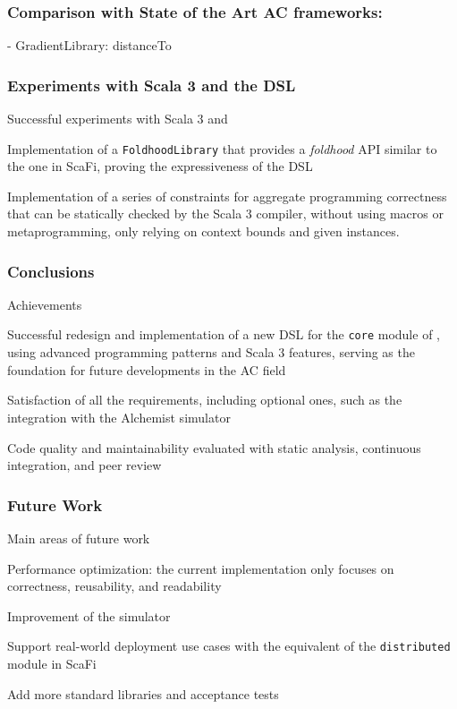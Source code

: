 \begin{frame}
    \frametitle{Comparison with State of the Art \ac{AC} frameworks: \this}
    \begin{exampleblock}{\this - GradientLibrary: distanceTo}
        
    \end{exampleblock}
\end{frame}

\begin{frame}
    \frametitle{Experiments with Scala 3 and the \ac{DSL}}
    \begin{blockitems}{Successful experiments with Scala 3 and \this}
        \item Implementation of a \texttt{FoldhoodLibrary} that provides a \textit{foldhood} \ac{API} similar to the one in ScaFi, proving the expressiveness of the \this \ac{DSL}
        \item Implementation of a series of constraints for aggregate programming correctness that can be statically checked by the Scala 3 compiler, without using macros or metaprogramming, only relying on context bounds and given instances.
    \end{blockitems}
\end{frame}

\begin{frame}
    \frametitle{Conclusions}
    \begin{blockitems}{Achievements}
        \item Successful redesign and implementation of a new \ac{DSL} for the \texttt{core} module of \this, using advanced programming patterns and Scala 3 features, serving as the foundation for future developments in the \ac{AC} field
        \item Satisfaction of all the requirements, including optional ones, such as the integration with the Alchemist simulator
        \item Code quality and maintainability evaluated with static analysis, continuous integration, and peer review
    \end{blockitems}
\end{frame}

\begin{frame}
    \frametitle{Future Work}
    \begin {blockitems}{Main areas of future work}
        \item Performance optimization: the current implementation only focuses on correctness, reusability, and readability
        \item Improvement of the simulator
        \item Support real-world deployment use cases with the equivalent of the \texttt{distributed} module in ScaFi
        \item Add more standard libraries and acceptance tests
    \end{blockitems}
\end{frame}

